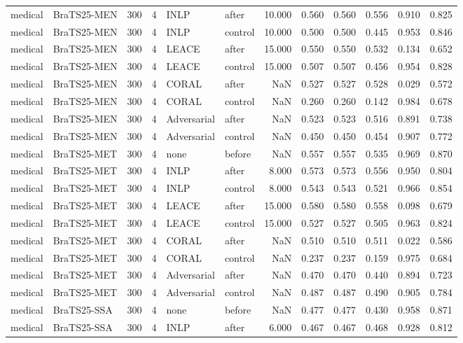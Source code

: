 \begin{tabular}{llrrllrrrrrr}
medical & BraTS25-MEN & 300 & 4 & INLP & after & 10.000 & 0.560 & 0.560 & 0.556 & 0.910 & 0.825 \\
medical & BraTS25-MEN & 300 & 4 & INLP & control & 10.000 & 0.500 & 0.500 & 0.445 & 0.953 & 0.846 \\
medical & BraTS25-MEN & 300 & 4 & LEACE & after & 15.000 & 0.550 & 0.550 & 0.532 & 0.134 & 0.652 \\
medical & BraTS25-MEN & 300 & 4 & LEACE & control & 15.000 & 0.507 & 0.507 & 0.456 & 0.954 & 0.828 \\
medical & BraTS25-MEN & 300 & 4 & CORAL & after & NaN & 0.527 & 0.527 & 0.528 & 0.029 & 0.572 \\
medical & BraTS25-MEN & 300 & 4 & CORAL & control & NaN & 0.260 & 0.260 & 0.142 & 0.984 & 0.678 \\
medical & BraTS25-MEN & 300 & 4 & Adversarial & after & NaN & 0.523 & 0.523 & 0.516 & 0.891 & 0.738 \\
medical & BraTS25-MEN & 300 & 4 & Adversarial & control & NaN & 0.450 & 0.450 & 0.454 & 0.907 & 0.772 \\
medical & BraTS25-MET & 300 & 4 & none & before & NaN & 0.557 & 0.557 & 0.535 & 0.969 & 0.870 \\
medical & BraTS25-MET & 300 & 4 & INLP & after & 8.000 & 0.573 & 0.573 & 0.556 & 0.950 & 0.804 \\
medical & BraTS25-MET & 300 & 4 & INLP & control & 8.000 & 0.543 & 0.543 & 0.521 & 0.966 & 0.854 \\
medical & BraTS25-MET & 300 & 4 & LEACE & after & 15.000 & 0.580 & 0.580 & 0.558 & 0.098 & 0.679 \\
medical & BraTS25-MET & 300 & 4 & LEACE & control & 15.000 & 0.527 & 0.527 & 0.505 & 0.963 & 0.824 \\
medical & BraTS25-MET & 300 & 4 & CORAL & after & NaN & 0.510 & 0.510 & 0.511 & 0.022 & 0.586 \\
medical & BraTS25-MET & 300 & 4 & CORAL & control & NaN & 0.237 & 0.237 & 0.159 & 0.975 & 0.684 \\
medical & BraTS25-MET & 300 & 4 & Adversarial & after & NaN & 0.470 & 0.470 & 0.440 & 0.894 & 0.723 \\
medical & BraTS25-MET & 300 & 4 & Adversarial & control & NaN & 0.487 & 0.487 & 0.490 & 0.905 & 0.784 \\
medical & BraTS25-SSA & 300 & 4 & none & before & NaN & 0.477 & 0.477 & 0.430 & 0.958 & 0.871 \\
medical & BraTS25-SSA & 300 & 4 & INLP & after & 6.000 & 0.467 & 0.467 & 0.468 & 0.928 & 0.812 \\

\end{tabular}
